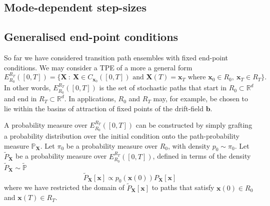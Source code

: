 \subsection{Mode-dependent step-sizes} \label{sec:Mode-dependent step-sizes}



\subsection{Generalised end-point conditions}

So far we have considered transition path ensembles with fixed end-point conditions. We may consider a TPE of a more a general form
\begin{equation}
	E_{R_0}^{R_T}([0,T]) = \{ \mathbf{X}\ :\ \mathbf{X} \in C_{\mathbf{x}_0}([0,T]) \text{ and } \mathbf{X}(T) = \mathbf{x}_T \text{ where } \mathbf{x}_0 \in R_0,\ \mathbf{x}_T \in R_T \}.
\end{equation}
In other words, $E_{R_0}^{R_T}([0,T])$ is the set of stochastic paths that start in $R_0 \subset \mathbb{R}^d$ and end in $R_T \subset \mathbb{R}^d$. In applications, $R_0$ and $R_T$ may, for example, be chosen to lie within the basins of attraction of fixed points of the drift-field $\mathbf{b}$.

A probability measure over $E_{R_0}^{R_T}([0,T])$ can be constructed by simply grafting a probability distribution over the initial condition onto the path-probability measure $\mathbb{P}_\mathbf{X}$. Let $\pi_0$ be a probability measure over $R_0$, with density $p_0 \sim \pi_0$. Let $\tilde{P}_\mathbf{X}$ be a probability measure over $E_{R_0}^{R_T}([0,T])$, defined in terms of the density $\tilde{P}_\mathbf{X} \sim \tilde{\mathbb{P}}$
\begin{equation}
	\tilde{P}_\mathbf{X}[\mathbf{x}] \propto p_0(\mathbf{x}(0)) P_\mathbf{X}[\mathbf{x}]
\end{equation}
where we have restricted the domain of $\tilde{P}_\mathbf{X}[\mathbf{x}]$ to paths that satisfy $\mathbf{x}(0) \in R_0$ and $\mathbf{x}(T) \in R_T$.

